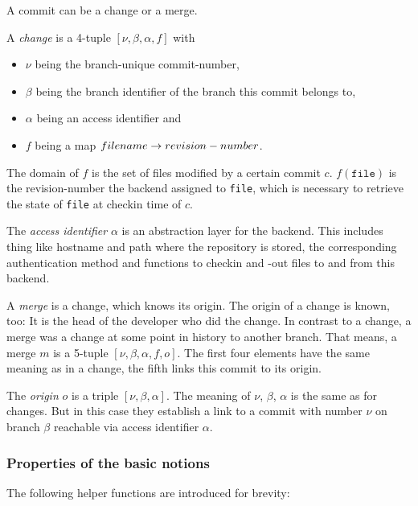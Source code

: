 \documentclass[fleqn, 10pt, a4paper]{article}
\begin{document}
A commit can be a change or a merge.

A \emph{change} is a 4-tuple $[\nu, \beta, \alpha, f]$ with
\begin{itemize}
\item $\nu$ being the branch-unique commit-number,
\item $\beta$ being the branch identifier of the branch
this commit belongs to,
\item $\alpha$ being an access identifier and
\item $f$ being a map $\mathnormal{filename} \rightarrow
\mathnormal{revision-number}$.
\end{itemize}

The domain of $f$ is the set of files modified by a certain
commit $c$. $f(\mathtt{file})$ is the revision-number the
backend assigned to \texttt{file}, which is necessary to
retrieve the state of \texttt{file} at checkin time of $c$.

The \emph{access identifier} $\alpha$ is an abstraction layer for the
backend. This includes thing like hostname and path where the
repository is stored, the corresponding authentication method
and functions to checkin and -out files to and from this backend.

A \emph{merge} is a change, which knows its origin. The origin of
a change is known, too: It is the head of the developer who did the
change. In contrast to a change, a merge was a change at some
point in history to another branch. That means, a merge $m$ is
a 5-tuple $[\nu, \beta, \alpha, f, o]$. The first four elements
have the same meaning as in a change, the fifth links this commit
to its origin.

The \emph{origin} $o$ is a triple $[\nu, \beta, \alpha]$. The meaning
of $\nu$, $\beta$, $\alpha$ is the same as for changes. But
in this case they establish a link to a commit with number $\nu$
on branch $\beta$ reachable via access identifier $\alpha$.

\subsubsection{Properties of the basic notions}

The following helper functions are introduced for brevity:
\end{document}
